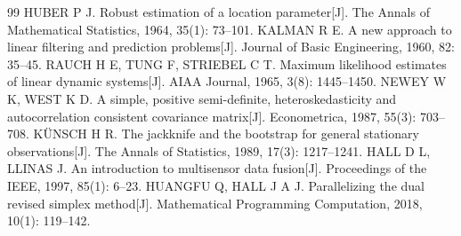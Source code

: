 \begin{thebibliography}{99}
 HUBER P J. Robust estimation of a location parameter[J]. The Annals of Mathematical Statistics, 1964, 35(1): 73--101.
 KALMAN R E. A new approach to linear filtering and prediction problems[J]. Journal of Basic Engineering, 1960, 82: 35--45.
 RAUCH H E, TUNG F, STRIEBEL C T. Maximum likelihood estimates of linear dynamic systems[J]. AIAA Journal, 1965, 3(8): 1445--1450.
 NEWEY W K, WEST K D. A simple, positive semi-definite, heteroskedasticity and autocorrelation consistent covariance matrix[J]. Econometrica, 1987, 55(3): 703--708.
 KÜNSCH H R. The jackknife and the bootstrap for general stationary observations[J]. The Annals of Statistics, 1989, 17(3): 1217--1241.
 HALL D L, LLINAS J. An introduction to multisensor data fusion[J]. Proceedings of the IEEE, 1997, 85(1): 6--23.
 HUANGFU Q, HALL J A J. Parallelizing the dual revised simplex method[J]. Mathematical Programming Computation, 2018, 10(1): 119--142.
\end{thebibliography}
